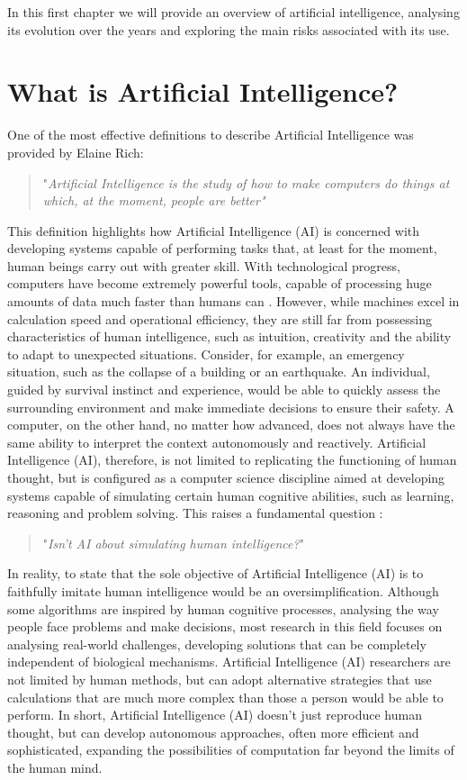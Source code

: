 
In this first chapter we will provide an overview of artificial intelligence, analysing its evolution over the years and  exploring the main risks associated with its use.

\section{What is Artificial Intelligence?}
One of the most effective definitions to describe Artificial Intelligence was provided by Elaine Rich\cite{RADA1986119}:
\begin{quote}
    "\textit{Artificial Intelligence is the study of how to make computers do things at which, at the moment, people are better"}
\end{quote}
This definition highlights how Artificial Intelligence (AI) is concerned with developing systems capable of performing tasks that, at least for the moment, human beings carry out with greater skill. With technological progress, computers have become extremely powerful tools, capable of processing huge amounts of data much faster than humans can \cite{introductionAI}.
However, while machines excel in calculation speed and operational efficiency, they are still far from possessing characteristics of human intelligence, such as intuition, creativity and the ability to adapt to unexpected situations.
Consider, for example, an emergency situation, such as the collapse of a building or an earthquake. An individual, guided by survival instinct and experience, would be able to quickly assess the surrounding environment and make immediate decisions to ensure their safety. A computer, on the other hand, no matter how advanced, does not always have the same ability to interpret the context autonomously and reactively.
Artificial Intelligence (AI), therefore, is not limited to replicating the functioning of human thought, but is configured as a computer science discipline aimed at developing systems capable of simulating certain human cognitive abilities, such as learning, reasoning and problem solving. This raises a fundamental question \cite{McCarthy2007}:  
\begin{quote}
    "\textit{Isn’t AI about simulating human intelligence?}"
\end{quote}
In reality, to state that the sole objective of Artificial Intelligence (AI) is to faithfully imitate human intelligence would be an oversimplification. Although some algorithms are inspired by human cognitive processes, analysing the way people face problems and make decisions, most research in this field focuses on analysing real-world challenges, developing solutions that can be completely independent of biological mechanisms. Artificial Intelligence (AI) researchers are not limited by human methods, but can adopt alternative strategies that use calculations that are much more complex than those a person would be able to perform.
In short, Artificial Intelligence (AI) doesn't just reproduce human thought, but can develop autonomous approaches, often more efficient and sophisticated, expanding the possibilities of computation far beyond the limits of the human mind.
